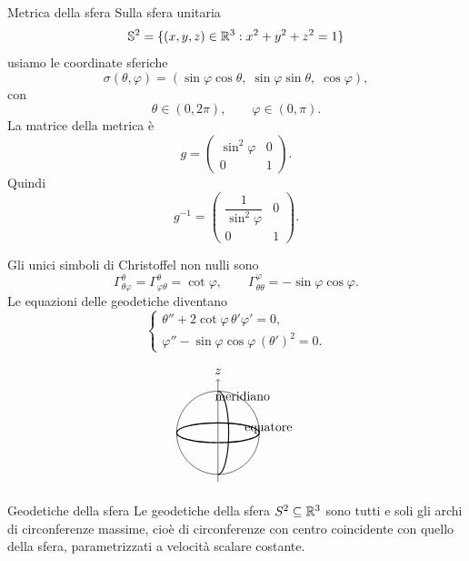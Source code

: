 \documentclass[a4paper]{article}
\begin{document}
\begin{snippetexample}{Metrica della sfera}
Sulla sfera unitaria
\[
    \mathbb{S}^2
    =
    \{(x,y,z)\in\mathbb{R}^3:x^2+y^2+z^2=1\}
\]
usiamo le coordinate sferiche
\[
    \sigma(\theta,\varphi)
    =
    (\sin\varphi\cos\theta,\;\sin\varphi\sin\theta,\;\cos\varphi),
\]
con
\[
    \theta\in(0,2\pi),
    \qquad
    \varphi\in(0,\pi).
\]
La matrice della metrica è
\[
    g
    =
    \begin{pmatrix}
        \sin^2\varphi & 0\\
        0 & 1
    \end{pmatrix}.
\]
Quindi
\[
    g^{-1}
    =
    \begin{pmatrix}
        \dfrac1{\sin^2\varphi} & 0\\[0.8em]
        0 & 1
    \end{pmatrix}.
\]

Gli unici simboli di Christoffel non nulli sono
\[
    \Gamma^\theta_{\theta\varphi}
    =
    \Gamma^\theta_{\varphi\theta}
    =
    \cot\varphi,
    \qquad
    \Gamma^\varphi_{\theta\theta}
    =
    -\sin\varphi\cos\varphi.
\]
Le equazioni delle geodetiche diventano
\[
    \begin{cases}
        \theta''+2\cot\varphi\,\theta'\varphi'=0,\\
        \varphi''-\sin\varphi\cos\varphi\,(\theta')^2=0.
    \end{cases}
\]

\[
    \begin{tikzpicture}[scale=0.85]
        \draw (0,0) circle (1.35);
        \draw[dashed] (-1.35,0) arc (180:360:1.35 and 0.32);
        \draw (1.35,0) arc (0:180:1.35 and 0.32);
        \draw[->] (0,-1.6) -- (0,1.75) node[above] {\(z\)};
        \draw[thick] (0,0) ellipse (1.35 and 0.32);
        \draw[thick] (0,-1.35) arc (-90:90:0.35 and 1.35);
        \node at (1.65,0.15) {equatore};
        \node at (0.8,1.2) {meridiano};
    \end{tikzpicture}
\]
\end{snippetexample}

\begin{snippetproposition}{Geodetiche della sfera}
    Le geodetiche della sfera \(S^2\subseteq\mathbb{R}^3\) sono tutti e soli gli archi di
    circonferenze massime, cioè di circonferenze con centro coincidente con quello della sfera,
    parametrizzati a velocità scalare costante.
\end{snippetproposition}
\end{document}
